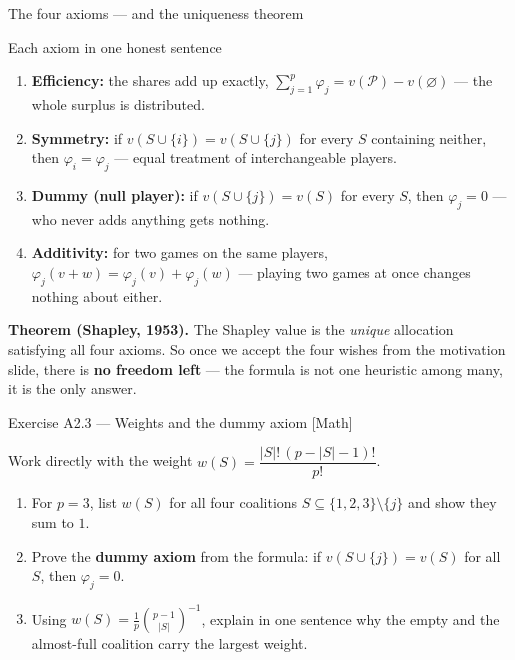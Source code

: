 \documentclass[aspectratio=169,11pt]{beamer}
\begin{document}
\begin{frame}{The four axioms --- and the uniqueness theorem}
  \begin{block}{Each axiom in one honest sentence}
    \begin{enumerate}
      \item \textbf{Efficiency:} the shares add up exactly,
            $\sum_{j=1}^{p}\varphi_j = v(\mathcal{P})-v(\varnothing)$ ---
            the whole surplus is distributed.
      \item \textbf{Symmetry:} if $v(S\cup\{i\})=v(S\cup\{j\})$ for every $S$
            containing neither, then $\varphi_i=\varphi_j$ --- equal treatment of
            interchangeable players.
      \item \textbf{Dummy (null player):} if $v(S\cup\{j\})=v(S)$ for every $S$,
            then $\varphi_j=0$ --- who never adds anything gets nothing.
      \item \textbf{Additivity:} for two games on the same players,
            $\varphi_j(v+w)=\varphi_j(v)+\varphi_j(w)$ --- playing two games at
            once changes nothing about either.
    \end{enumerate}
  \end{block}
  \begin{takeaway}
    \textbf{Theorem (Shapley, 1953).} The Shapley value is the \emph{unique}
    allocation satisfying all four axioms. So once we accept the four wishes from
    the motivation slide, there is \textbf{no freedom left} --- the formula is not one
    heuristic among many, it is the only answer.
  \end{takeaway}
\end{frame}

\begin{frame}{Exercise A2.3 --- Weights and the dummy axiom [Math]}
\begin{exercise}
  Work directly with the weight $w(S) = \dfrac{|S|!\,(p-|S|-1)!}{p!}$.
  \begin{enumerate}
    \item For $p=3$, list $w(S)$ for all four coalitions
          $S\subseteq\{1,2,3\}\setminus\{j\}$ and show they sum to $1$.
    \item Prove the \textbf{dummy axiom} from the formula: if
          $v(S\cup\{j\})=v(S)$ for all $S$, then $\varphi_j=0$.
    \item Using $w(S)=\frac1p\binom{p-1}{|S|}^{-1}$, explain in one sentence why
          the empty and the almost-full coalition carry the largest weight.
  \end{enumerate}
\end{exercise}
\end{frame}
\end{document}
